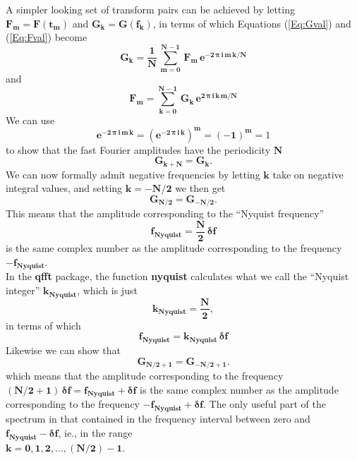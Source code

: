 \documentclass[11pt]{article}
\begin{document}
\noindent A simpler looking set of transform pairs can be achieved by
  letting $\mathbf{F_{m} = F(t_{m})}$ and $\mathbf{G_{k} = G(f_{k})}$, in terms
  of which Equations (\ref{Eq:Gval}) and (\ref{Eq:Fval}) become
\begin{equation}  \label{Eq:Gval2}
\mathbf{G_{k}} = 
  \mathbf{\frac{1}{N}\,\sum_{m = 0}^{N - 1}\, F_{m}\,
               e^{-2\,\boldsymbol{\pi}\,i\,m\,k/N}}
\end{equation}
and
\begin{equation}  \label{Eq:Fval2}
\mathbf{F_{m}} = 
  \mathbf{\sum_{k = 0}^{N - 1}\, G_{k}\,
               e^{2\,\boldsymbol{\pi}\,i\,k\,m/N}}
\end{equation}
We can use
\begin{equation}
\mathbf{e^{-2\,\boldsymbol{\pi}\,i\,m\,k}}=\mathbf{(e^{-2\,\boldsymbol{\pi}\,i\,k})^{m}} =
  \mathbf{(-1)^{m}} = 1
\end{equation}
to show that the fast Fourier amplitudes have the periodicity $\mathbf{N}$
\begin{equation}
\mathbf{G_{k + N}} = \mathbf{G_{k}}.
\end{equation}
We can now formally admit  negative frequencies by letting $\mathbf{k}$ take
  on negative integral values, and setting $\mathbf{k = -N/2}$ we then get
\begin{equation}
\mathbf{G_{N/2}} = \mathbf{G_{-N/2}}.
\end{equation}
\newpage
\noindent This means that the amplitude corresponding to the ``Nyquist frequency''
\begin{equation} \label{Eq:fnyq}
  \mathbf{ f_{Nyquist} = \frac{N}{2}\,\boldsymbol{\delta}f }
\end{equation}
  is the same complex  number as the amplitude corresponding to the 
  frequency $\mathbf{-f_{Nyquist}}$.\\
In the \textbf{qfft} package, the function \textbf{nyquist} calculates
  what we call the ``Nyquist integer'' $\mathbf{k_{Nyquist}}$, which is just
\begin{equation} \label{Eq:knyq}
\mathbf{k_{Nyquist} = \frac{N}{2}},
\end{equation} 
in terms of which 
\begin{equation}
\mathbf{ f_{Nyquist} = k_{Nyquist}\, \boldsymbol{\delta}f }
\end{equation}
Likewise we can show that
\begin{equation}
\mathbf{G_{N/2 + 1}} = \mathbf{G_{-N/2 + 1}}.
\end{equation}
which means that the amplitude corresponding to the frequency
  $\mathbf{(N/2 + 1)\,\boldsymbol{\delta}f = f_{Nyquist} + \boldsymbol{\delta}f}$ 
  is the same complex number as the amplitude corresponding to the 
  frequency $\mathbf{-f_{Nyquist} + \boldsymbol{\delta}f}$.
The only useful part of the spectrum in that contained in the frequency interval
  between zero and $\mathbf{f_{Nyquist} - \boldsymbol{\delta}f}$, ie., in the range \\
  $\mathbf{k = 0, 1, 2, ..., (N/2) -1}$.\\
  
\end{document}
